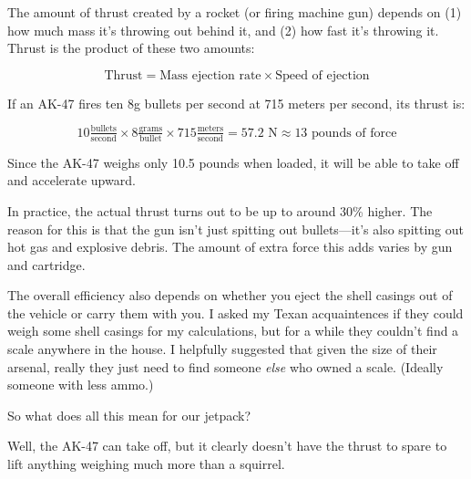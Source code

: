 {The amount of thrust created by a rocket (or firing machine gun) depends on (1) how much mass it’s throwing out behind it, and (2) how fast it’s throwing it. Thrust is the product of these two amounts:}

{\[\text{Thrust}=\text{Mass ejection rate}\times\text{Speed of ejection}\]}

{If an AK-47 fires ten 8g bullets per second at 715 meters per second, its thrust is:}

{\[10\tfrac{\text{bullets}}{\text{second}}\times8\tfrac{\text{grams}}{\text{bullet}}\times715\tfrac{\text{meters}}{\text{second}}=57.2\text{ N}\approx13\text{ pounds of force}\]}

{Since the AK-47 weighs only 10.5 pounds when loaded, it will be able to take off and accelerate upward.}

{In practice, the actual thrust turns out to be up to around 30\% higher. The reason for this is that the gun isn’t just spitting out bullets—it’s also spitting out hot gas and explosive debris. The amount of extra force this adds varies by gun and cartridge.}

{The overall efficiency also depends on whether you eject the shell casings out of the vehicle or carry them with you. I asked my Texan acquaintences if they could weigh some shell casings for my calculations, but for a while they couldn't find a scale anywhere in the house. I helpfully suggested that given the size of their arsenal, really they just need to find someone \emph{else} who owned a scale. (Ideally someone with less ammo.)}

{So what does all this mean for our jetpack?}

{Well, the AK-47 can take off, but it clearly doesn’t have the thrust to spare to lift anything weighing much more than a squirrel.}


